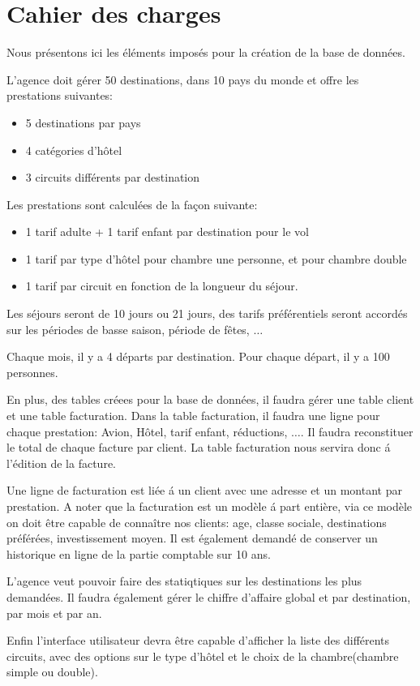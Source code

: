 \section{Cahier des charges}
Nous pr\'esentons ici les \'el\'ements impos\'es pour la cr\'eation de la base de donn\'ees.

L'agence doit g\'erer 50 destinations, dans 10 pays du monde et offre les prestations suivantes:
\begin{itemize}
\item 5 destinations par pays
\item 4 cat\'egories d'h\^otel
\item 3 circuits diff\'erents par destination
\end{itemize}

Les prestations sont calcul\'ees de la fa\c{c}on suivante:
\begin{itemize}
\item 1 tarif adulte + 1 tarif enfant par destination pour le vol
\item 1 tarif par type d'h\^otel pour chambre une personne, et pour chambre double
\item 1 tarif par circuit en fonction de la longueur du s\'ejour.
\end{itemize}

Les s\'ejours seront de 10 jours ou 21 jours, des tarifs pr\'ef\'erentiels seront accord\'es sur les p\'eriodes de basse saison, p\'eriode de f\^etes, $\ldots$

Chaque mois, il y a 4 d\'eparts par destination. Pour chaque d\'epart, il y a 100 personnes.

En plus, des tables cr\'eees pour la base de donn\'ees, il faudra g\'erer une table client et une table facturation. Dans la table facturation, il faudra une ligne pour chaque prestation: Avion, H\^otel, tarif enfant, r\'eductions, $\ldots$. Il faudra reconstituer le total de chaque facture par client. La table facturation nous servira donc \'a l'\'edition de la facture.

Une ligne de facturation est li\'ee \'a un client avec une adresse et un montant par prestation. A noter que la	facturation est un mod\`ele \'a part enti\`ere, via ce mod\`ele on doit \^etre capable de conna\^itre nos clients: age, classe sociale, destinations pr\'ef\'er\'ees, investissement moyen. Il est \'egalement demand\'e de conserver un historique en ligne de la partie comptable sur 10 ans.

L'agence veut pouvoir faire des statiqtiques sur les destinations les plus demand\'ees. Il faudra \'egalement g\'erer le chiffre d'affaire global et par destination, par mois et par an.

Enfin l'interface utilisateur devra \^etre capable d'afficher la liste des diff\'erents circuits, avec des options sur le type d'h\^otel et le choix de la chambre(chambre simple ou double).

